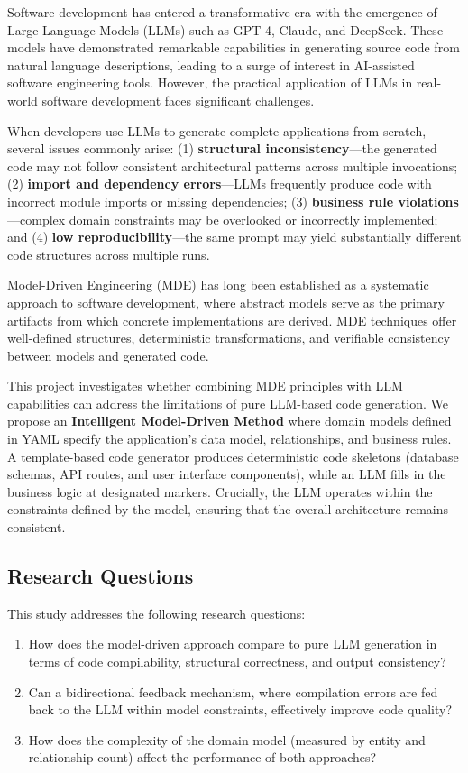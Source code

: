 \documentclass[11pt,a4paper]{article}
\begin{document}
Software development has entered a transformative era with the emergence of Large Language Models (LLMs) such as GPT-4, Claude, and DeepSeek. These models have demonstrated remarkable capabilities in generating source code from natural language descriptions, leading to a surge of interest in AI-assisted software engineering tools. However, the practical application of LLMs in real-world software development faces significant challenges.

When developers use LLMs to generate complete applications from scratch, several issues commonly arise: (1) \textbf{structural inconsistency}---the generated code may not follow consistent architectural patterns across multiple invocations; (2) \textbf{import and dependency errors}---LLMs frequently produce code with incorrect module imports or missing dependencies; (3) \textbf{business rule violations}---complex domain constraints may be overlooked or incorrectly implemented; and (4) \textbf{low reproducibility}---the same prompt may yield substantially different code structures across multiple runs.

Model-Driven Engineering (MDE) has long been established as a systematic approach to software development, where abstract models serve as the primary artifacts from which concrete implementations are derived. MDE techniques offer well-defined structures, deterministic transformations, and verifiable consistency between models and generated code.

This project investigates whether combining MDE principles with LLM capabilities can address the limitations of pure LLM-based code generation. We propose an \textbf{Intelligent Model-Driven Method} where domain models defined in YAML specify the application's data model, relationships, and business rules. A template-based code generator produces deterministic code skeletons (database schemas, API routes, and user interface components), while an LLM fills in the business logic at designated markers. Crucially, the LLM operates within the constraints defined by the model, ensuring that the overall architecture remains consistent.

\subsection{Research Questions}

This study addresses the following research questions:

\begin{enumerate}[label=\textbf{RQ\arabic*:}, leftmargin=*]
    \item How does the model-driven approach compare to pure LLM generation in terms of code compilability, structural correctness, and output consistency?
    \item Can a bidirectional feedback mechanism, where compilation errors are fed back to the LLM within model constraints, effectively improve code quality?
    \item How does the complexity of the domain model (measured by entity and relationship count) affect the performance of both approaches?
\end{enumerate}
\end{document}
